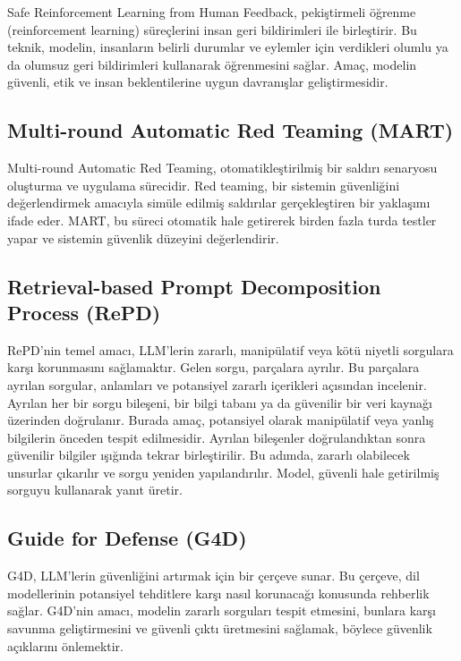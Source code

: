 Safe Reinforcement Learning from Human Feedback, pekiştirmeli öğrenme (reinforcement learning) süreçlerini insan geri bildirimleri ile birleştirir. Bu teknik, modelin, insanların belirli durumlar ve eylemler için verdikleri olumlu ya da olumsuz geri bildirimleri kullanarak öğrenmesini sağlar. Amaç, modelin güvenli, etik ve insan beklentilerine uygun davranışlar geliştirmesidir.

\newpage

\subsection{Multi-round Automatic Red Teaming (MART)}

Multi-round Automatic Red Teaming, otomatikleştirilmiş bir saldırı senaryosu oluşturma ve uygulama sürecidir. Red teaming, bir sistemin güvenliğini değerlendirmek amacıyla simüle edilmiş saldırılar gerçekleştiren bir yaklaşımı ifade eder. MART, bu süreci otomatik hale getirerek birden fazla turda testler yapar ve sistemin güvenlik düzeyini değerlendirir.

\newpage

\subsection{Retrieval-based Prompt Decomposition Process (RePD)}

RePD'nin temel amacı, LLM'lerin zararlı, manipülatif veya kötü niyetli sorgulara karşı korunmasını sağlamaktır. Gelen sorgu, parçalara ayrılır. Bu parçalara ayrılan sorgular, anlamları ve potansiyel zararlı içerikleri açısından incelenir. Ayrılan her bir sorgu bileşeni, bir bilgi tabanı ya da güvenilir bir veri kaynağı üzerinden doğrulanır. Burada amaç, potansiyel olarak manipülatif veya yanlış bilgilerin önceden tespit edilmesidir. Ayrılan bileşenler doğrulandıktan sonra güvenilir bilgiler ışığında tekrar birleştirilir. Bu adımda, zararlı olabilecek unsurlar çıkarılır ve sorgu yeniden yapılandırılır. Model, güvenli hale getirilmiş sorguyu kullanarak yanıt üretir.

\newpage

\subsection{Guide for Defense (G4D)}

G4D, LLM'lerin güvenliğini artırmak için bir çerçeve sunar. Bu çerçeve, dil modellerinin potansiyel tehditlere karşı nasıl korunacağı konusunda rehberlik sağlar. G4D'nin amacı, modelin zararlı sorguları tespit etmesini, bunlara karşı savunma geliştirmesini ve güvenli çıktı üretmesini sağlamak, böylece güvenlik açıklarını önlemektir. 

